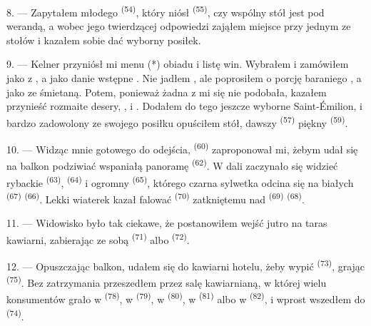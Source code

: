 8. --- Zapytałem młodego  \textsuperscript{(54)}, który niósł
 \textsuperscript{(55)}, czy wspólny stół jest pod werandą, a
wobec jego twierdzącej odpowiedzi zająłem miejsce przy jednym ze stołów i kazałem sobie
dać wyborny posiłek.


\VUsaut{4.0mm}
\VUsaut{3.0mm}

9. --- Kelner przyniósł mi menu (*) obiadu i listę win. Wybrałem i zamówiłem jako
 z , a jako danie wstępne . Nie jadłem , ale poprosiłem o porcję baraniego
, a jako  ze śmietaną. Potem, ponieważ
żadna z  mi się nie podobała, kazałem przynieść rozmaite desery,
,  i . Dodałem do tego jeszcze wyborne
 Saint-Émilion, i bardzo zadowolony ze swojego posiłku opuściłem stół,
dawszy  \textsuperscript{(57)} piękny 
\textsuperscript{(59)}.

10. --- Widząc mnie gotowego do odejścia,  \textsuperscript{(60)}
zaproponował mi, żebym udał się na balkon podziwiać wspaniałą panoramę 
\textsuperscript{(62)}. W dali zaczynało się widzieć rybackie 
\textsuperscript{(63)},  \textsuperscript{(64)} i ogromny
 \textsuperscript{(65)}, którego czarna sylwetka odcina się na
białych  \textsuperscript{(67)} 
\textsuperscript{(66)}. Lekki wiaterek kazał falować 
\textsuperscript{(70)} zatkniętemu nad  \textsuperscript{(69)}
 \textsuperscript{(68)}.

\VUsaut{3.0mm}
\VUsaut{3.0mm}

11. --- Widowisko było tak ciekawe, że postanowiłem wejść jutro na taras kawiarni,
zabierając ze sobą  \textsuperscript{(71)} albo
 \textsuperscript{(72)}.

12. --- Opuszczając balkon, udałem się do kawiarni hotelu, żeby wypić 
\textsuperscript{(73)}, grając  \textsuperscript{(75)}. Bez
zatrzymania przeszedłem przez salę kawiarnianą, w której wielu konsumentów grało w
 \textsuperscript{(78)}, w  \textsuperscript{(79)}, w
 \textsuperscript{(80)}, w 
\textsuperscript{(81)} albo w  \textsuperscript{(82)}, i wprost wszedłem
do  \textsuperscript{(74)}.

